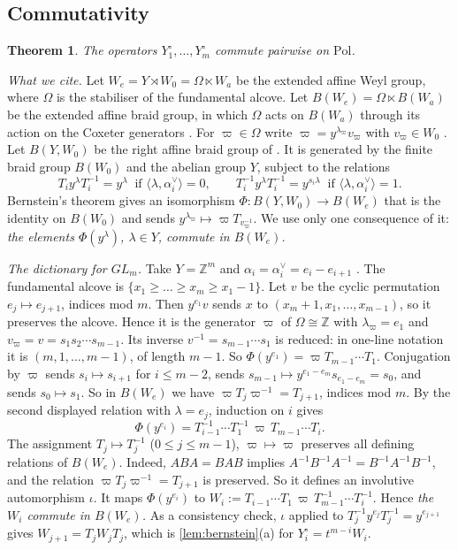 \documentclass[11pt]{amsart}
\newtheorem{theorem}{Theorem}[section]
\theoremstyle{definition}
\theoremstyle{remark}
\numberwithin{equation}{section}
\begin{document}
\subsection{Commutativity}
\begin{theorem}\label{thm:C1}
The operators $Y^\circ_1,\dots,Y^\circ_m$ commute pairwise on $\mathrm{Pol}$.
\end{theorem}

\emph{What we cite.} Let $W_e=Y\rtimes W_0=\Omega\ltimes W_a$ be the extended affine Weyl group, where $\Omega$ is the stabiliser of the fundamental alcove. Let $B(W_e)=\Omega\ltimes B(W_a)$ be the extended affine braid group, in which $\Omega$ acts on $B(W_a)$ through its action on the Coxeter generators \cite[\S\S3.9--3.13, 4.1]{Haiman06}. For $\varpi\in\Omega$ write $\varpi=y^{\lambda_\varpi}v_\varpi$ with $v_\varpi\in W_0$ \cite[(13)]{Haiman06}. Let $B(Y,W_0)$ be the right affine braid group of \cite[\S2.9]{Haiman06}. It is generated by the finite braid group $B(W_0)$ and the abelian group $Y$, subject to the relations \cite[(8)--(9)]{Haiman06}
\[ T_iy^\lambda T_i^{-1}=y^\lambda\ \text{ if }\langle\lambda,\alpha_i^\vee\rangle=0,\qquad T_i^{-1}y^\lambda T_i^{-1}=y^{s_i\lambda}\ \text{ if }\langle\lambda,\alpha_i^\vee\rangle=1 . \]
Bernstein's theorem \cite[Thm.~4.2]{Haiman06} gives an isomorphism $\Phi\colon B(Y,W_0)\to B(W_e)$ that is the identity on $B(W_0)$ and sends $y^{\lambda_\varpi}\mapsto\varpi T_{v_\varpi^{-1}}$. We use only one consequence of it: \emph{the elements $\Phi(y^\lambda)$, $\lambda\in Y$, commute in $B(W_e)$.}

\emph{The dictionary for $GL_m$.} Take $Y=\mathbb{Z}^m$ and $\alpha_i=\alpha_i^\vee=e_i-e_{i+1}$ \cite[Ex.~2.5]{Haiman06}. The fundamental alcove is $\{x_1\ge\dots\ge x_m\ge x_1-1\}$. Let $v$ be the cyclic permutation $e_j\mapsto e_{j+1}$, indices mod $m$. Then $y^{e_1}v$ sends $x$ to $(x_m+1,x_1,\dots,x_{m-1})$, so it preserves the alcove. Hence it is the generator $\varpi$ of $\Omega\cong\mathbb{Z}$ with $\lambda_\varpi=e_1$ and $v_\varpi=v=s_1s_2\cdots s_{m-1}$. Its inverse $v^{-1}=s_{m-1}\cdots s_1$ is reduced: in one-line notation it is $(m,1,\dots,m-1)$, of length $m-1$. So $\Phi(y^{e_1})=\varpi T_{m-1}\cdots T_1$. Conjugation by $\varpi$ sends $s_i\mapsto s_{i+1}$ for $i\le m-2$, sends $s_{m-1}\mapsto y^{e_1-e_m}s_{e_1-e_m}=s_0$, and sends $s_0\mapsto s_1$. So in $B(W_e)$ we have $\varpi T_j\varpi^{-1}=T_{j+1}$, indices mod $m$. By the second displayed relation with $\lambda=e_j$, induction on $i$ gives
\[ \Phi(y^{e_i})=T_{i-1}^{-1}\cdots T_1^{-1}\,\varpi\,T_{m-1}\cdots T_i . \]
The assignment $T_j\mapsto T_j^{-1}$ ($0\le j\le m-1$), $\varpi\mapsto\varpi$ preserves all defining relations of $B(W_e)$. Indeed, $ABA=BAB$ implies $A^{-1}B^{-1}A^{-1}=B^{-1}A^{-1}B^{-1}$, and the relation $\varpi T_j\varpi^{-1}=T_{j+1}$ is preserved. So it defines an involutive automorphism $\iota$. It maps $\Phi(y^{e_i})$ to $W_i:=T_{i-1}\cdots T_1\,\varpi\,T_{m-1}^{-1}\cdots T_i^{-1}$. Hence \emph{the $W_i$ commute in $B(W_e)$.} As a consistency check, $\iota$ applied to $T_j^{-1}y^{e_j}T_j^{-1}=y^{e_{j+1}}$ gives $W_{j+1}=T_jW_jT_j$, which is \cref{lem:bernstein}(a) for $Y^\circ_i=t^{m-i}W_i$.
\end{document}
